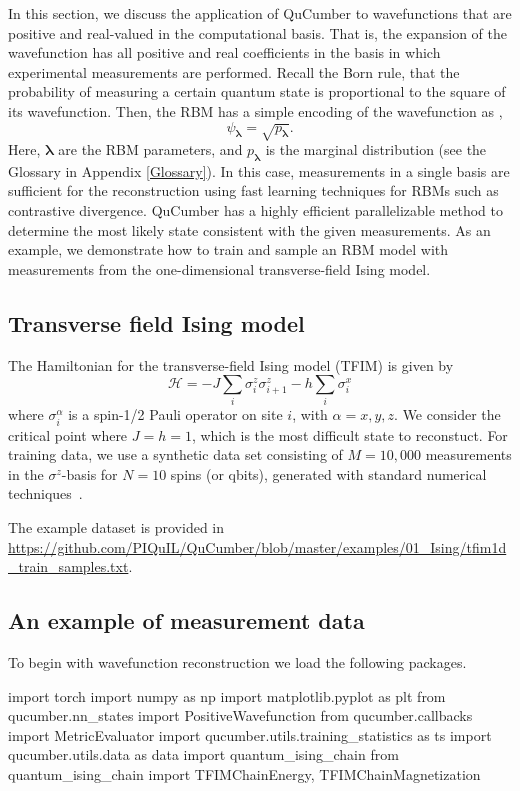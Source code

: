\documentclass[submission, Phys]{SciPost}
\begin{document}
In this section, we discuss the application of QuCumber to wavefunctions that are positive and real-valued in the computational basis.
That is, the expansion of the wavefunction has all positive and real coefficients in the basis in which experimental
measurements are performed.
Recall the Born rule, that the probability of measuring a certain quantum state is proportional to the square of its wavefunction.  
Then, the RBM has a simple encoding of the wavefunction as \cite{torlai2018tomography},
\begin{equation}
\psi_{\bm{\lambda}}= \sqrt{p_{\bm{\lambda}}}.
\end{equation}  
Here, ${\bm \lambda}$ are the RBM parameters, and $p_{\bm{\lambda}}$ is the marginal distribution (see the Glossary in Appendix \ref{Glossary}).
In this case, measurements in a single basis are sufficient for the reconstruction using fast learning techniques for RBMs such as contrastive divergence.
QuCumber has a highly efficient parallelizable method to determine the most likely state consistent with the given measurements.
As an example, we demonstrate how to train and sample an RBM model with measurements from the one-dimensional transverse-field Ising model.

\subsection{Transverse field Ising model}
\label{Sec:Training_TFIM}

The Hamiltonian for the transverse-field Ising model (TFIM) is given by
\begin{equation}
	\mathcal{H} = -J\sum_i \sigma^z_i \sigma^z_{i+1} - h \sum_i \sigma^x_i \label{TFIM}	
\end{equation}
where $\sigma^{\alpha}_i$ is a spin-1/2 Pauli operator on site $i$, with $\alpha=x,y,z$. We consider the critical point where $J=h=1$, which is the most difficult state to reconstuct.
For training data, we use a synthetic data set consisting of $M=10,000$ measurements in the $\sigma^z$-basis for $N=10$ spins (or qbits), generated with standard numerical techniques~\cite{itensor}.

The example dataset is provided in \url{https://github.com/PIQuIL/QuCumber/blob/master/examples/01_Ising/tfim1d_train_samples.txt}.

\subsection{An example of measurement data}
To begin with wavefunction reconstruction we load the following packages.
\begin{python}
import torch
import numpy as np
import matplotlib.pyplot as plt
from qucumber.nn_states import PositiveWavefunction
from qucumber.callbacks import MetricEvaluator
import qucumber.utils.training_statistics as ts
import qucumber.utils.data as data
import quantum_ising_chain
from quantum_ising_chain import TFIMChainEnergy, TFIMChainMagnetization
\end{python}
\end{document}
